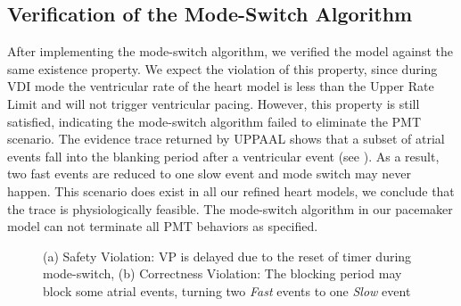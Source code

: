 \subsection{Verification of the Mode-Switch Algorithm}
After implementing the mode-switch algorithm, we verified the model against the same existence property. We expect the violation of this property, since during VDI mode the ventricular rate of the heart model is less than the Upper Rate Limit and will not trigger ventricular pacing. However, this property is still satisfied, indicating the mode-switch algorithm failed to eliminate the PMT scenario. The evidence trace returned by UPPAAL shows that a subset of atrial events fall into the blanking period after a ventricular event (see ). As a result, two fast events are reduced to one slow event and mode switch may never happen. This scenario does exist in all our refined heart models, we conclude that the trace is physiologically feasible. The mode-switch algorithm in our pacemaker model can not terminate all PMT behaviors as specified.
\begin{figure}
\centering
		\vspace{-10pt}
	\caption{(a) Safety Violation: VP is delayed due to the reset of timer during mode-switch, (b) Correctness Violation: The blocking period may block some atrial events, turning two \emph{Fast} events to one \emph{Slow} event \cite{TACAS12}}
\vspace{-20pt}
\end{figure} 
